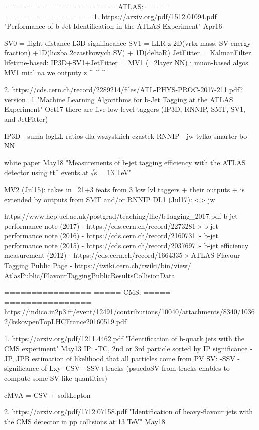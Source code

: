 ================
==== ATLAS: ====
================
1. 
https://arxiv.org/pdf/1512.01094.pdf 
"Performance of b-Jet Identification in the ATLAS Experiment" Apr16

SV0 = flight distance L3D signifiacance
SV1 = LLR z 2D(vrtx mass, SV energy fraction) +1D(liczba 2czastkowych SV) + 1D(deltaR)
JetFitter = KalmanFilter
lifetime-based: IP3D+SV1+JetFitter = MV1 (=2layer NN)  i  muon-based algos
MV1 mial na we outputy z ^ ^ ^


2.
https://cds.cern.ch/record/2289214/files/ATL-PHYS-PROC-2017-211.pdf?version=1
"Machine Learning Algorithms for b-Jet Tagging at the ATLAS Experiment" Oct17
there are five low-level taggers (IP3D, RNNIP, SMT, SV1, and JetFitter) 

IP3D - suma logLL ratios dla wszystkich czastek
RNNIP - jw tylko smarter bo NN

white paper May18
"Measurements of b-jet tagging efficiency with the ATLAS detector using tt¯ events at √s = 13 TeV"

MV2 (Jul15): takes in ~21+3 feats from 3 low lvl taggers + their outputs + is extended by outputs from SMT and/or RNNIP
DL1 (Jul17): <> jw



https://www.hep.ucl.ac.uk/postgrad/teaching/lhc/bTagging_2017.pdf
b-jet performance note (2017) - https://cds.cern.ch/record/2273281
» b-jet performance note (2016) - https://cds.cern.ch/record/2160731
» b-jet performance note (2015) - https://cds.cern.ch/record/2037697
» b-jet efficiency measurement (2012) - https://cds.cern.ch/record/1664335
» ATLAS Flavour Tagging Public Page - https://twiki.cern.ch/twiki/bin/view/
AtlasPublic/FlavourTaggingPublicResultsCollisionData







================
===== CMS: =====
================
https://indico.in2p3.fr/event/12491/contributions/10040/attachments/8340/10362/kskovpenTopLHCFrance20160519.pdf

1.
https://arxiv.org/pdf/1211.4462.pdf
"Identification of b-quark jets with the CMS experiment" May13
IP:
-TC, 2nd or 3rd particle sorted by IP significance
-JP, JPB estimation of likelihood that all particles come from PV
SV:
-SSV - significance of Lxy
-CSV - SSV+tracks (psuedoSV from tracks enables to compute some SV-like quantities)

cMVA = CSV + softLepton

2.
https://arxiv.org/pdf/1712.07158.pdf
"Identification of heavy-flavour jets with the CMS detector in pp collisions at 13 TeV" May18

